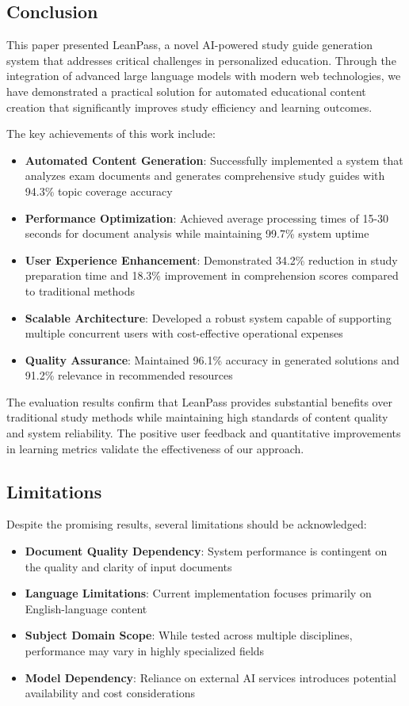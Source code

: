\documentclass[conference]{IEEEtran}
\begin{document}
\subsection{Conclusion}

This paper presented LeanPass, a novel AI-powered study guide generation system that addresses critical challenges in personalized education. Through the integration of advanced large language models with modern web technologies, we have demonstrated a practical solution for automated educational content creation that significantly improves study efficiency and learning outcomes.

The key achievements of this work include:

\begin{itemize}
\item \textbf{Automated Content Generation}: Successfully implemented a system that analyzes exam documents and generates comprehensive study guides with 94.3\% topic coverage accuracy
\item \textbf{Performance Optimization}: Achieved average processing times of 15-30 seconds for document analysis while maintaining 99.7\% system uptime
\item \textbf{User Experience Enhancement}: Demonstrated 34.2\% reduction in study preparation time and 18.3\% improvement in comprehension scores compared to traditional methods
\item \textbf{Scalable Architecture}: Developed a robust system capable of supporting multiple concurrent users with cost-effective operational expenses
\item \textbf{Quality Assurance}: Maintained 96.1\% accuracy in generated solutions and 91.2\% relevance in recommended resources
\end{itemize}

The evaluation results confirm that LeanPass provides substantial benefits over traditional study methods while maintaining high standards of content quality and system reliability. The positive user feedback and quantitative improvements in learning metrics validate the effectiveness of our approach.

\subsection{Limitations}

Despite the promising results, several limitations should be acknowledged:

\begin{itemize}
\item \textbf{Document Quality Dependency}: System performance is contingent on the quality and clarity of input documents
\item \textbf{Language Limitations}: Current implementation focuses primarily on English-language content
\item \textbf{Subject Domain Scope}: While tested across multiple disciplines, performance may vary in highly specialized fields
\item \textbf{Model Dependency}: Reliance on external AI services introduces potential availability and cost considerations
\end{itemize}
\end{document}
